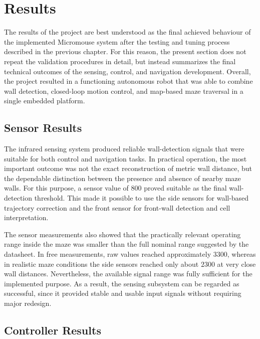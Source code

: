\section{Results}

The results of the project are best understood as the final achieved behaviour of the implemented Micromouse system after the testing and tuning process described in the previous chapter. For this reason, the present section does not repeat the validation procedures in detail, but instead summarizes the final technical outcomes of the sensing, control, and navigation development. Overall, the project resulted in a functioning autonomous robot that was able to combine wall detection, closed-loop motion control, and map-based maze traversal in a single embedded platform.

\subsection{Sensor Results}

The infrared sensing system produced reliable wall-detection signals that were suitable for both control and navigation tasks. In practical operation, the most important outcome was not the exact reconstruction of metric wall distance, but the dependable distinction between the presence and absence of nearby maze walls. For this purpose, a sensor value of $800$ proved suitable as the final wall-detection threshold. This made it possible to use the side sensors for wall-based trajectory correction and the front sensor for front-wall detection and cell interpretation.

The sensor measurements also showed that the practically relevant operating range inside the maze was smaller than the full nominal range suggested by the datasheet. In free measurements, raw values reached approximately $3300$, whereas in realistic maze conditions the side sensors reached only about $2300$ at very close wall distances. Nevertheless, the available signal range was fully sufficient for the implemented purpose. As a result, the sensing subsystem can be regarded as successful, since it provided stable and usable input signals without requiring major redesign.

\subsection{Controller Results}

